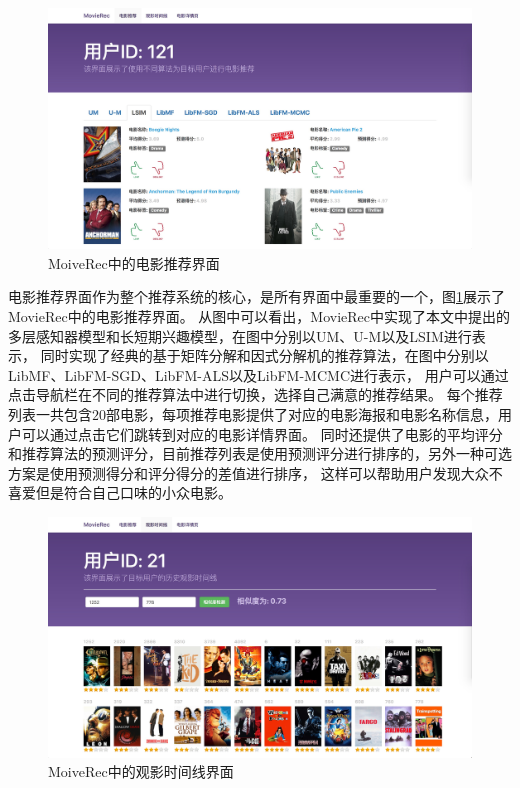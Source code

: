 \begin{figure}[htbp]
\centering
\includegraphics[scale=0.16]{images/systemshow1.jpeg}
\caption{MoiveRec中的电影推荐界面}
\label{fig:systemshow1}
\end{figure}

电影推荐界面作为整个推荐系统的核心，是所有界面中最重要的一个，图\ref{fig:systemshow1}展示了MovieRec中的电影推荐界面。
从图中可以看出，MovieRec中实现了本文中提出的多层感知器模型和长短期兴趣模型，在图中分别以UM、U-M以及LSIM进行表示，
同时实现了经典的基于矩阵分解和因式分解机的推荐算法，在图中分别以LibMF、LibFM-SGD、LibFM-ALS以及LibFM-MCMC进行表示，
用户可以通过点击导航栏在不同的推荐算法中进行切换，选择自己满意的推荐结果。
每个推荐列表一共包含$20$部电影，每项推荐电影提供了对应的电影海报和电影名称信息，用户可以通过点击它们跳转到对应的电影详情界面。
同时还提供了电影的平均评分和推荐算法的预测评分，目前推荐列表是使用预测评分进行排序的，另外一种可选方案是使用预测得分和评分得分的差值进行排序，
这样可以帮助用户发现大众不喜爱但是符合自己口味的小众电影。

\begin{figure}[htbp]
\centering
\includegraphics[scale=0.16]{images/systemshow2.jpeg}
\caption{MoiveRec中的观影时间线界面}
\label{fig:systemshow2}
\end{figure}

